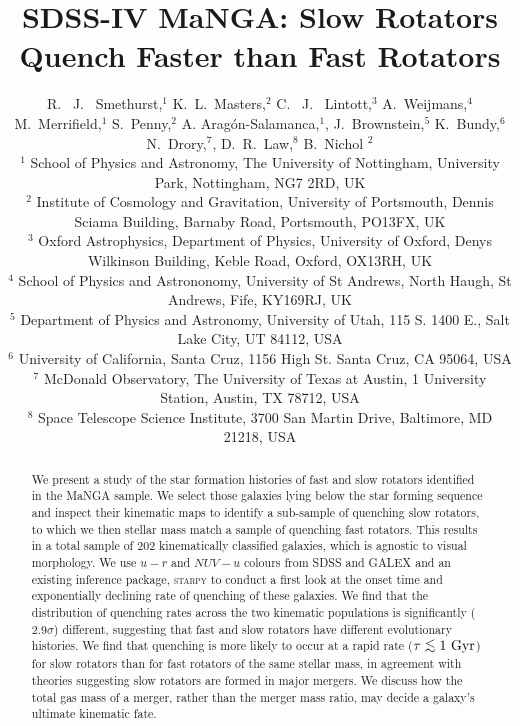 \documentclass[useAMS,usenatbib]{mn2e}
\def\lesssim{\mathrel{\hbox{\rlap{\hbox{\lower3pt\hbox{$\sim$}}}\hbox{\raise2pt\hbox{$<$}}}}}
\begin{document}
\title[Quenching Histories of Fast and Slow Rotators]{SDSS-IV MaNGA: Slow Rotators Quench Faster than Fast Rotators}
\author[Smethurst et al. 2017]{R. ~J. ~Smethurst,$^{1}$ K.~L.~Masters,$^{2}$  C. ~J. ~Lintott,$^{3}$ A.~Weijmans,$^{4}$  M.~Merrifield,$^{1}$ \newauthor S.~Penny,$^{2}$ A. Arag\'on-Salamanca,$^{1}$,  J.~Brownstein,$^{5}$ K.~Bundy,$^{6}$  N.~Drory,$^{7}$, \newauthor  D.~R.~Law,$^{8}$ B.~Nichol $^{2}$ 
\\ $^1$ School of Physics and Astronomy, The University of Nottingham, University Park, Nottingham, NG7 2RD, UK
\\ $^2$ Institute of Cosmology and Gravitation, University of Portsmouth, Dennis Sciama Building, Barnaby Road, Portsmouth, PO13FX, UK 
\\ $^3$ Oxford Astrophysics, Department of Physics, University of Oxford, Denys Wilkinson Building, Keble Road, Oxford, OX13RH, UK
\\ $^4$ School of Physics and Astrononomy, University of St Andrews, North Haugh, St Andrews, Fife, KY169RJ, UK
\\ $^5$ Department of Physics and Astronomy, University of Utah, 115 S. 1400 E., Salt Lake City, UT 84112, USA
\\ $^6$ 	University of California, Santa Cruz, 1156 High St. Santa Cruz, CA 95064, USA
\\ $^7$ McDonald Observatory, The University of Texas at Austin, 1 University Station, Austin, TX 78712, USA
\\ $^8$ Space Telescope Science Institute, 3700 San Martin Drive, Baltimore, MD 21218, USA
}

\maketitle

\begin{abstract}
We present a study of the star formation histories of fast and slow rotators identified in the MaNGA sample. We select those galaxies lying below the star forming sequence and inspect their kinematic maps to identify a sub-sample of quenching slow rotators, to which we then stellar mass match a sample of quenching fast rotators. This results in a total sample of $202$ kinematically classified galaxies, which is agnostic to visual morphology. We use $u-r$ and $NUV-u$ colours from SDSS and GALEX and an existing inference package, \textsc{starpy} to conduct a first look at the onset time and exponentially declining rate of quenching of these galaxies. We find that the distribution of quenching rates across the two kinematic populations is significantly ($2.9\sigma$) different, suggesting that fast and slow rotators have different evolutionary histories. We find that quenching is more likely to occur at a rapid rate ($\tau \lesssim 1~\rm{Gyr}$) for slow rotators than for fast rotators of the same stellar mass, in agreement with theories suggesting slow rotators are formed in major mergers. We discuss how the total gas mass of a merger, rather than the merger mass ratio, may decide a galaxy's ultimate kinematic fate. 
\end{abstract}
\end{document}
